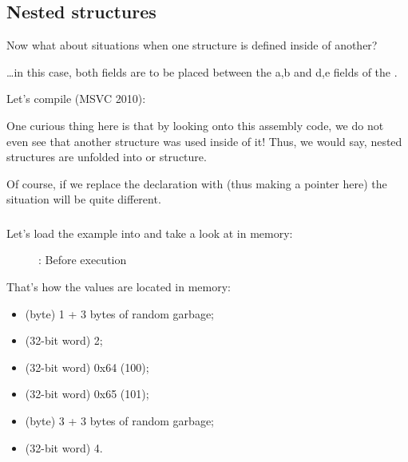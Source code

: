 \subsection{Nested structures}

Now what about situations when one structure is defined inside of another?



\dots in this case, both  fields are to be placed between the a,b and d,e fields of
the .

Let's compile (MSVC 2010):



One curious thing here is that by looking onto this assembly code, we do not even see that
another structure was used inside of it!
Thus, we would say, nested structures are unfolded into  or  structure.

Of course, if we replace the  declaration with  
(thus making a pointer here) the situation will be quite different.

\clearpage
\subsubsection{\olly}
\myindex{\olly}

Let's load the example into \olly and take a look at 
 in memory:

\begin{figure}[H]
\centering
{}
\caption{\olly: Before \printf execution}
\label{fig:nested_olly}
\end{figure}

That's how the values are located in memory:
\begin{itemize}
\item {} (byte) 1 + 3 bytes of random garbage;
\item {} (32-bit word) 2;
\item {} (32-bit word) 0x64 (100);
\item {} (32-bit word) 0x65 (101);
\item {} (byte) 3 + 3 bytes of random garbage;
\item {} (32-bit word) 4.
\end{itemize}

